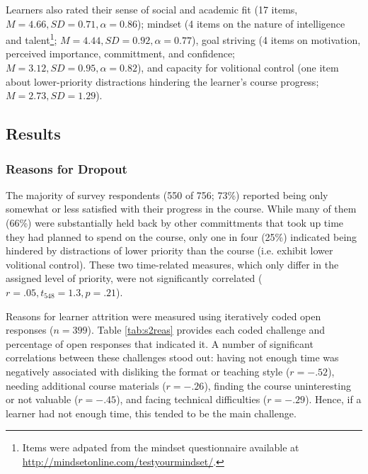 \documentclass{sigchi}\usepackage[]{graphicx}\usepackage[]{color}
\begin{document}
Learners also rated their sense of social and academic fit \cite{walton2007question} (17 items, $M=4.66, SD=0.71, \alpha=0.86$); mindset (4 items on the nature of intelligence and talent\footnote{Items were adpated from the mindset questionnaire available at \url{http://mindsetonline.com/testyourmindset/}.}; $M=4.44, SD=0.92, \alpha=0.77$), goal striving (4 items on motivation, perceived importance, committment, and confidence; $M=3.12, SD=0.95, \alpha=0.82$), and capacity for volitional control (one item about lower-priority distractions hindering the learner's course progress; $M=2.73, SD=1.29$).

\subsection{Results}



\subsubsection{Reasons for Dropout}

The majority of survey respondents (550 of 756; 73\%) reported being only somewhat or less satisfied with their progress in the course. While many of them (66\%) were substantially held back by other committments that took up time they had planned to spend on the course, only one in four (25\%) indicated being hindered by distractions of lower priority than the course (i.e. exhibit lower volitional control). These two time-related measures, which only differ in the assigned level of priority, were not significantly correlated ($r=.05, t_{548}=1.3, p=.21$).

Reasons for learner attrition were measured using iteratively coded open responses ($n=399$). Table \ref{tab:s2reas} provides each coded challenge and percentage of open responses that indicated it. A number of significant correlations between these challenges stood out: having not enough time was negatively associated with disliking the format or teaching style ($r=-.52$), needing additional course materials ($r=-.26$), finding the course uninteresting or not valuable ($r=-.45$), and facing technical difficulties ($r=-.29$). Hence, if a learner had not enough time, this tended to be the main challenge.
\end{document}
